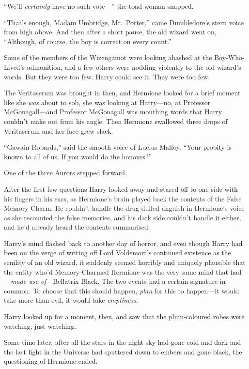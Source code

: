 ``We'll \emph{certainly} have no such vote---'' the toad-woman snapped.

``That's enough, Madam Umbridge, Mr.~Potter,'' came Dumbledore's stern
voice from high above. And then after a short pause, the old wizard went
on, ``Although, of course, the boy is correct on every count.''

Some of the members of the Wizengamot were looking abashed at the
Boy-Who-Lived's admonition, and a few others were nodding violently to
the old wizard's words. But they were too few. Harry could see it. They
were too few.

The Veritaserum was brought in then, and Hermione looked for a brief
moment like she \emph{was} about to sob, she was looking at Harry---no,
at Professor McGonagall---and Professor McGonagall was mouthing words
that Harry couldn't make out from his angle. Then Hermione swallowed
three drops of Veritaserum and her face grew slack.

``Gawain Robards,'' said the smooth voice of Lucius Malfoy. ``Your
probity is known to all of us. If you would do the honours?''

One of the three Aurors stepped forward.

After the first few questions Harry looked away and stared off to one
side with his fingers in his ears, as Hermione's brain played back the
contents of the False Memory Charm. He couldn't handle the drug-dulled
anguish in Hermione's voice as she recounted the false memories, and his
dark side couldn't handle it either, and he'd already heard the contents
summarised.

Harry's mind flashed back to another day of horror, and even though
Harry had been on the verge of writing off Lord Voldemort's continued
existence as the senility of an old wizard, it suddenly seemed horribly
and uniquely plausible that the entity who'd Memory-Charmed Hermione was
the very same mind that had---\emph{made use of}---Bellatrix Black. The
two events had a certain signature in common. To choose that this should
happen, \emph{plan} for this to happen---it would take more than evil,
it would take \emph{emptiness}.

Harry looked up for a moment, then, and saw that the plum-coloured robes
were watching, just watching.

Some time later, after all the stars in the night sky had gone cold and
dark and the last light in the Universe had sputtered down to embers and
gone black, the questioning of Hermione ended.

